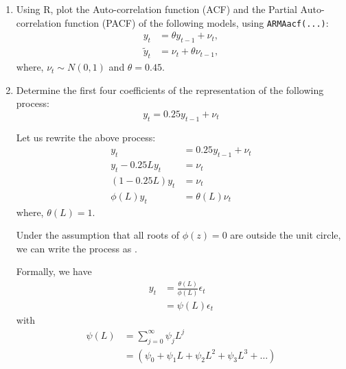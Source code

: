 \begin{enumerate}
    \item Using R, plot the Auto-correlation function (ACF) and the Partial Auto-correlation function (PACF) of the following models, using \verb|ARMAacf(...)|:
          \begin{align*}
              y_t
               & = \theta y_{t-1} + \nu_t,
              \\
              \tilde y_t
               & = \nu_t + \theta \nu_{t-1},
          \end{align*}
          where, $\nu_t \sim N(0, 1)$ and $\theta = 0.45$.

          \begin{sol}
              
          \end{sol}

    \item Determine the first four coefficients of the \maq[$\infty$]{} representation of the following \arp[1]{} process:
          \[ y_t = 0.25 y_{t-1} + \nu_t \]

          \begin{sol}
              Let us rewrite the above process:
              \begin{align*}
                  y_t              & = 0.25 y_{t-1} + \nu_t \\
                  y_t - 0.25 L y_t & = \nu_t                \\
                  (1 - 0.25L) y_t  & = \nu_t                \\
                  \phi(L) y_t      & = \theta(L) \nu_t
              \end{align*}
              where, $\theta(L) = 1$.

              Under the assumption that all roots of $\phi(z)=0$ are outside the unit circle, we can write the \armapq{} process as \maq[$\infty$]{}.

              Formally, we have
              \begin{align*}
                  y_t & = \frac{\theta(L)}{\phi(L)}\epsilon_t \\
                      & = \psi(L)\epsilon_t
              \end{align*}
              with
              \begin{align*}
                  \psi(L) & = \sum_{j=0}^{\infty}\psi_{j}L^{j}              \\
                          & = (\psi_0+\psi_1 L+\psi_2 L^2+\psi_3 L^3+\dots)
              \end{align*}


\end{sol}
\end{enumerate}
